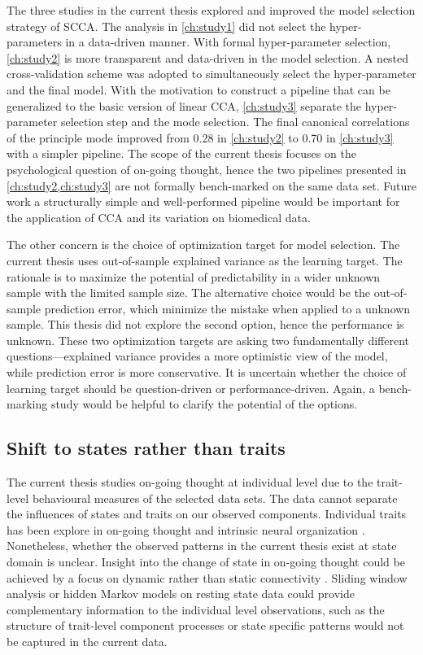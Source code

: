 The three studies in the current thesis explored and improved the model selection strategy of SCCA. The analysis in \cref{ch:study1} did not select the hyper-parameters in a data-driven manner. With formal hyper-parameter selection, \cref{ch:study2} is more transparent and data-driven in the model selection. A nested cross-validation scheme was adopted to simultaneously select the hyper-parameter and the final model. With the motivation to construct a pipeline that can be generalized to the basic version of linear CCA, \cref{ch:study3} separate the hyper-parameter selection step and the mode selection. The final canonical correlations of the principle mode improved from 0.28 in \cref{ch:study2} to 0.70 in \cref{ch:study3} with a simpler pipeline. The scope of the current thesis focuses on the psychological question of on-going thought, hence the two pipelines presented in \cref{ch:study2,ch:study3} are not formally bench-marked on the same data set. Future work a structurally simple and well-performed pipeline would be important for the application of CCA and its variation on biomedical data.

The other concern is the choice of optimization target for model selection. The current thesis uses out-of-sample explained variance as the learning target. The rationale is to maximize the potential of predictability in a wider unknown sample with the limited sample size. The alternative choice would be the out-of-sample prediction error, which minimize the mistake when applied to a unknown sample. This thesis did not explore the second option, hence the performance is unknown. These two optimization targets are asking two fundamentally different questions---explained variance provides a more optimistic view of the model, while prediction error is more conservative. It is uncertain whether the choice of learning target should be question-driven or performance-driven. Again, a bench-marking study would be helpful to clarify the potential of the options. 

\subsection{Shift to states rather than traits}

The current thesis studies on-going thought at individual level due to the trait-level behavioural measures of the selected data sets. The data cannot separate the influences of states and traits on our observed components. Individual traits has been explore in on-going thought \cite{Smallwood2016,McVay2009,RubyPlos2013} and intrinsic neural organization \cite{Smith2015}. Nonetheless, whether the observed patterns in the current thesis exist at state domain is unclear. Insight into the change of state in on-going thought could be achieved by a focus on dynamic rather than static connectivity \cite{KucyiNI2017}. Sliding window analysis \cite{Chang2010} or hidden Markov models \cite{Vidaurre2017} on resting state data could provide complementary information to the individual level observations, such as the structure of trait-level component processes or state specific patterns would not be captured in the current data.


